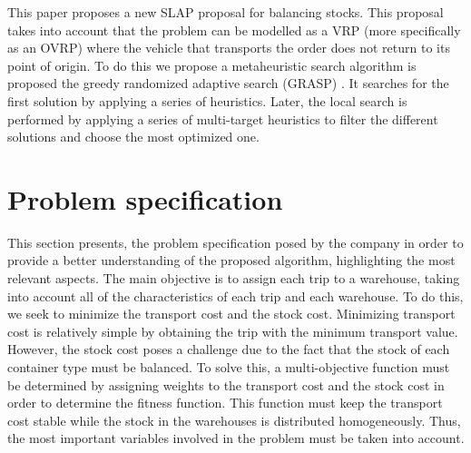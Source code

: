 \documentclass[letterpaper]{article} %
\begin{document}
This paper proposes a new SLAP proposal for balancing stocks. This proposal takes into account that the problem can be modelled as a VRP (more specifically as an OVRP) where the vehicle that transports the order does not return to its point of origin. To do this we propose a metaheuristic search algorithm is proposed the greedy randomized adaptive search (GRASP) \cite{Li1991}. It searches for the first solution by applying a series of heuristics. Later, the local search is performed by applying a series of multi-target heuristics to filter the different solutions and choose the most optimized one.

\section*{Problem specification}

This section presents, the problem specification posed by the company in order to provide a better understanding of the proposed algorithm, highlighting the most relevant aspects. The main objective is to assign each trip to a warehouse, taking into account all of the characteristics of each trip and each warehouse. To do this, we seek to minimize the transport cost and the stock cost. Minimizing transport cost is relatively simple by obtaining the trip with the minimum transport value. However, the stock cost poses a challenge due to the fact that the stock of each container type must be balanced. To solve this, a multi-objective function must be determined by assigning weights to the transport cost and the stock cost in order to determine the fitness function. This function must keep the transport cost stable while the stock in the warehouses is distributed homogeneously. Thus, the most important variables involved in the problem must be taken into account.
\end{document}
